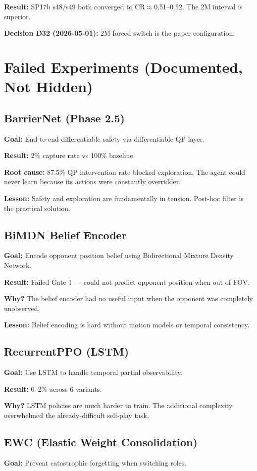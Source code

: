 \documentclass[11pt,a4paper]{report}
\begin{document}
\textbf{Result:} SP17b s48/s49 both converged to CR$\approx$0.51--0.52. The 2M interval is superior.

\textbf{Decision D32 (2026-05-01):} 2M forced switch is the paper configuration.

\section{Failed Experiments (Documented, Not Hidden)}

\subsection{BarrierNet (Phase 2.5)}
\textbf{Goal:} End-to-end differentiable safety via differentiable QP layer.

\textbf{Result:} 2\% capture rate vs 100\% baseline.

\textbf{Root cause:} 87.5\% QP intervention rate blocked exploration. The agent could never learn because its actions were constantly overridden.

\textbf{Lesson:} Safety and exploration are fundamentally in tension. Post-hoc filter is the practical solution.

\subsection{BiMDN Belief Encoder}
\textbf{Goal:} Encode opponent position belief using Bidirectional Mixture Density Network.

\textbf{Result:} Failed Gate 1 --- could not predict opponent position when out of FOV.

\textbf{Why?} The belief encoder had no useful input when the opponent was completely unobserved.

\textbf{Lesson:} Belief encoding is hard without motion models or temporal consistency.

\subsection{RecurrentPPO (LSTM)}
\textbf{Goal:} Use LSTM to handle temporal partial observability.

\textbf{Result:} 0--2\% across 6 variants.

\textbf{Why?} LSTM policies are much harder to train. The additional complexity overwhelmed the already-difficult self-play task.

\subsection{EWC (Elastic Weight Consolidation)}
\textbf{Goal:} Prevent catastrophic forgetting when switching roles.
\end{document}
